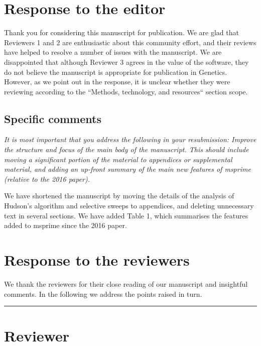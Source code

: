 \documentclass[11pt]{article}
\newcounter{reviewer}
\newcounter{point}[reviewer]
\newcommand{\reviewersection}{\stepcounter{reviewer} \bigskip \hrule
                  \section*{Reviewer \thereviewer}}
\begin{document}
\section*{Response to the editor}
Thank you for considering this manuscript for publication. We are glad that
Reviewers 1 and 2 are enthusiastic about this community effort, and their reviews
have helped to resolve a number of issues with the manuscript. We are
disappointed that although Reviewer 3 agrees in the value of the software,
they do not believe the manuscript
is appropriate for publication in Genetics. However, as we point out in the
response, it is unclear whether they were reviewing according to the
``Methods, technology, and resources`` section scope.

\subsection*{Specific comments}

\textit{
It is most important that you address the following in your resubmission:
Improve the structure and focus of the main body of the manuscript. This should
include moving a significant portion of the material to appendices or
supplemental material, and adding an up-front summary of the main new features
of msprime (relative to the 2016 paper).}

We have shortened the manuscript by moving the details of the analysis
of Hudson's algorithm and selective sweeps to appendices, and deleting
unnecessary text in several sections. We have added Table 1, which
summarises the features added to msprime since the 2016 paper.

\section*{Response to the reviewers}
We thank the reviewers for their close reading of our manuscript and
insightful comments. In the following we address the points raised
in turn.

\reviewersection
\end{document}
